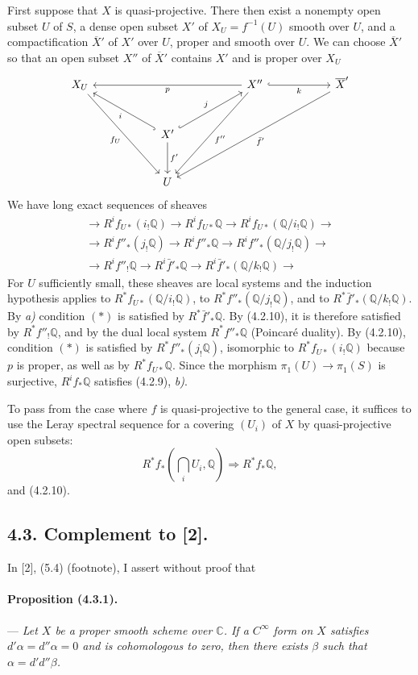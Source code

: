 \documentclass[10pt]{article}
\newcommand{\C}{\mathbb C}
\newcommand{\Q}{\mathbb Q}
\begin{document}
First suppose that $X$ is quasi-projective. There then exist a nonempty open subset $U$ of $S$, a dense open subset $X'$ of $X_U=f^{-1}(U)$ smooth over $U$, and a compactification $\overline X'$ of $X'$ over $U$, proper and smooth over $U$. We can choose $\overline X'$ so that an open subset $X''$ of $\overline X'$ contains $X'$ and is proper over $X_U$
\[
\begin{tikzcd}[column sep=2.8em,row sep=2.8em]
X_U \arrow[ddrr,"f_U"'] &&&&
X'' \arrow[llll,"p"] \arrow[rr,hook,"k"'] \arrow[ddll,"f''"] &&
\overline X' \arrow[ddllll,"\bar f'"] \\
&& X' \arrow[ull,hook,"i"] \arrow[urr,hook,"j"] \arrow[d,"f'"] &&&& \\
&& U &&&&
\end{tikzcd}
\]
We have long exact sequences of sheaves
\[
\begin{gathered}
\to R^if_{U*}(i_!\Q)\to R^if_{U*}\Q\to R^if_{U*}(\Q/i_!\Q)\to\\
\to R^if''_*(j_!\Q)\to R^if''_*\Q\to R^if''_*(\Q/j_!\Q)\to\\
\to R^if''_!\Q\to R^i\bar f'_*\Q\to R^i\bar f'_*(\Q/k_!\Q)\to
\end{gathered}
\]
For $U$ sufficiently small, these sheaves are local systems and the induction hypothesis applies to $R^*f_{U*}(\Q/i_!\Q)$, to $R^*f''_*(\Q/j_!\Q)$, and to $R^*\bar f'_*(\Q/k_!\Q)$. By \textit{a)} condition $(*)$ is satisfied by $R^*\bar f'_*\Q$. By (4.2.10), it is therefore satisfied by $R^*f''_!\Q$, and by the dual local system $R^*f''_*\Q$ (Poincaré duality). By (4.2.10), condition $(*)$ is satisfied by $R^*f''_*(j_!\Q)$, isomorphic to $R^*f_{U*}(i_!\Q)$ because $p$ is proper, as well as by $R^*f_{U*}\Q$. Since the morphism $\pi_1(U)\to\pi_1(S)$ is surjective, $R^if_*\Q$ satisfies (4.2.9), \textit{b)}.

To pass from the case where $f$ is quasi-projective to the general case, it suffices to use the Leray spectral sequence for a covering $(U_i)$ of $X$ by quasi-projective open subsets:
\[
R^*f_*(\bigcap_iU_i,\Q)\Rightarrow R^*f_*\Q,
\]
and (4.2.10).

\subsection*{4.3. Complement to [2].}

In [2], (5.4) (footnote), I assert without proof that

\paragraph{Proposition (4.3.1).} --- {\itshape Let $X$ be a proper smooth scheme over $\C$. If a $C^\infty$ form on $X$ satisfies $d'\alpha=d''\alpha=0$ and is cohomologous to zero, then there exists $\beta$ such that $\alpha=d'd''\beta$.}
\end{document}
